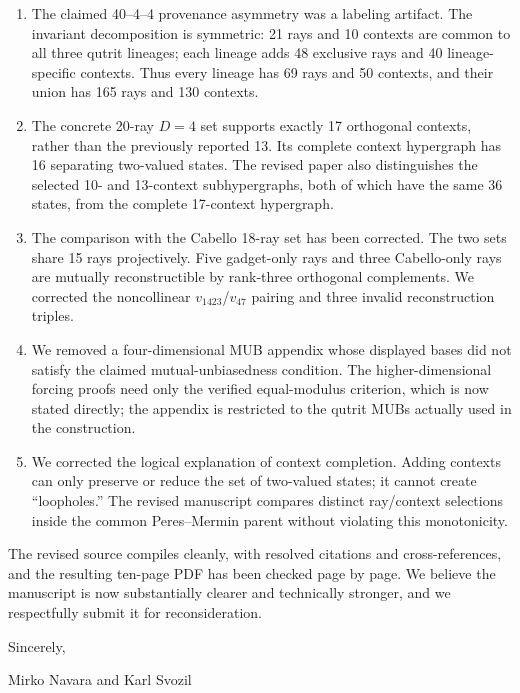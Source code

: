 \documentclass[11pt]{article}
\begin{document}
\begin{enumerate}
\item The claimed 40--4--4 provenance asymmetry was a labeling artifact.  The invariant decomposition is symmetric: 21 rays and 10 contexts are common to all three qutrit lineages; each lineage adds 48 exclusive rays and 40 lineage-specific contexts.  Thus every lineage has 69 rays and 50 contexts, and their union has 165 rays and 130 contexts.

\item The concrete 20-ray $D=4$ set supports exactly 17 orthogonal contexts, rather than the previously reported 13.  Its complete context hypergraph has 16 separating two-valued states.  The revised paper also distinguishes the selected 10- and 13-context subhypergraphs, both of which have the same 36 states, from the complete 17-context hypergraph.

\item The comparison with the Cabello 18-ray set has been corrected.  The two sets share 15 rays projectively.  Five gadget-only rays and three Cabello-only rays are mutually reconstructible by rank-three orthogonal complements.  We corrected the noncollinear $v_{1423}$/$v_{47}$ pairing and three invalid reconstruction triples.

\item We removed a four-dimensional MUB appendix whose displayed bases did not satisfy the claimed mutual-unbiasedness condition.  The higher-dimensional forcing proofs need only the verified equal-modulus criterion, which is now stated directly; the appendix is restricted to the qutrit MUBs actually used in the construction.

\item We corrected the logical explanation of context completion.  Adding contexts can only preserve or reduce the set of two-valued states; it cannot create ``loopholes.''  The revised manuscript compares distinct ray/context selections inside the common Peres--Mermin parent without violating this monotonicity.
\end{enumerate}

The revised source compiles cleanly, with resolved citations and cross-references, and the resulting ten-page PDF has been checked page by page.  We believe the manuscript is now substantially clearer and technically stronger, and we respectfully submit it for reconsideration.

Sincerely,

Mirko Navara and Karl Svozil
\end{document}

